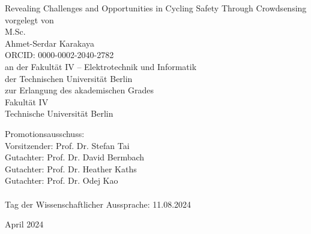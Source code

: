 
\thispagestyle{empty}
\begin{center}
    \huge{Revealing Challenges and Opportunities in Cycling Safety Through Crowdsensing}\\[2pc]
    
    \large{vorgelegt von}\\
    \large{M.Sc.}\\
    \large{Ahmet-Serdar Karakaya}\\
    \large{ORCID: 0000-0002-2040-2782}\\[2pc]


    an der Fakultät IV – Elektrotechnik und Informatik\\
    der Technischen Universität Berlin\\
    zur Erlangung des akademischen Grades\\
    Fakultät IV\\
    Technische Universität Berlin
\end{center}
Promotionsausschuss:\\
Vorsitzender: Prof. Dr. Stefan Tai\\
Gutachter: Prof. Dr. David Bermbach\\
Gutachter: Prof. Dr. Heather Kaths\\
Gutachter: Prof. Dr. Odej Kao\\
\\
Tag der Wissenschaftlicher Aussprache: 11.08.2024\\
\begin{center}
April 2024
\end{center}

\afterpage{\null\thispagestyle{empty}\newpage}
